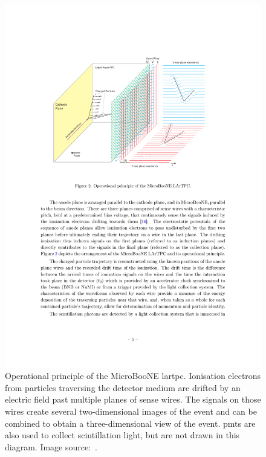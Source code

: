 \begin{figure}[]
\centering
\includegraphics[width=.90\textwidth]{images/MicroBooNE/tpc}
\caption[MicroBooNE Time Projection Chamber]{Operational principle of the MicroBooNE \acrshort{lartpc}. Ionisation electrons from particles traversing the detector medium are drifted by an electric field past multiple planes of sense wires. The signals on those wires create several two-dimensional images of the event and can be combined to obtain a three-dimensional view of the event. \acrshort{pmt}s are also used to collect scintillation light, but are not drawn in this diagram. Image source:~\cite{det}.}
\label{fig:tpc}
\end{figure}


